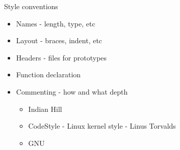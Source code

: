 \documentclass{beamer}
\begin{document}
\begin{frame}{Style conventions}
  \begin{itemize}
  \item Names - length, type, etc
  \item Layout - braces, indent, etc
  \item Headers - files for prototypes
  \item Function declaration
  \item Commenting - how and what depth
    \begin{itemize}
    \item Indian Hill
    \item CodeStyle - Linux kernel style - Linus Torvalds
    \item GNU
    \end{itemize}
  \end{itemize}
\end{frame}



  

\end{document}
